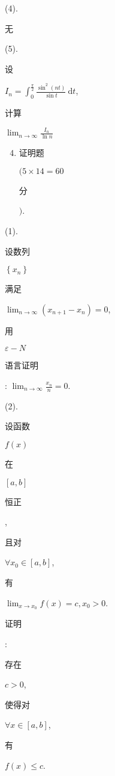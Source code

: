 \documentclass[10pt]{article}
\begin{document}
(4). \begin{CJK}{UTF8}{mj}无\end{CJK}

(5). \begin{CJK}{UTF8}{mj}设\end{CJK} $I_{n}=\int_{0}^{\frac{\pi}{2}} \frac{\sin ^{2}(n t)}{\sin t} \mathrm{~d} t$, \begin{CJK}{UTF8}{mj}计算\end{CJK} $\lim _{n \rightarrow \infty} \frac{I_{n}}{\ln n}$

\begin{enumerate}
  \setcounter{enumi}{3}
  \item \begin{CJK}{UTF8}{mj}证明题\end{CJK} $(5 \times 14=60$ \begin{CJK}{UTF8}{mj}分\end{CJK} $)$.
\end{enumerate}
(1). \begin{CJK}{UTF8}{mj}设数列\end{CJK} $\left\{x_{n}\right\}$ \begin{CJK}{UTF8}{mj}满足\end{CJK} $\lim _{n \rightarrow \infty}\left(x_{n+1}-x_{n}\right)=0$, \begin{CJK}{UTF8}{mj}用\end{CJK} $\varepsilon-N$ \begin{CJK}{UTF8}{mj}语言证明\end{CJK}: $\lim _{n \rightarrow \infty} \frac{x_{n}}{n}=0$.

(2). \begin{CJK}{UTF8}{mj}设函数\end{CJK} $f(x)$ \begin{CJK}{UTF8}{mj}在\end{CJK} $[a, b]$ \begin{CJK}{UTF8}{mj}恒正\end{CJK}, \begin{CJK}{UTF8}{mj}且对\end{CJK} $\forall x_{0} \in[a, b]$, \begin{CJK}{UTF8}{mj}有\end{CJK} $\lim _{x \rightarrow x_{0}} f(x)=c, x_{0}>0$. \begin{CJK}{UTF8}{mj}证明\end{CJK}: \begin{CJK}{UTF8}{mj}存在\end{CJK} $c>0$, \begin{CJK}{UTF8}{mj}使得对\end{CJK} $\forall x \in[a, b]$, \begin{CJK}{UTF8}{mj}有\end{CJK} $f(x) \leq c$.
\end{document}
